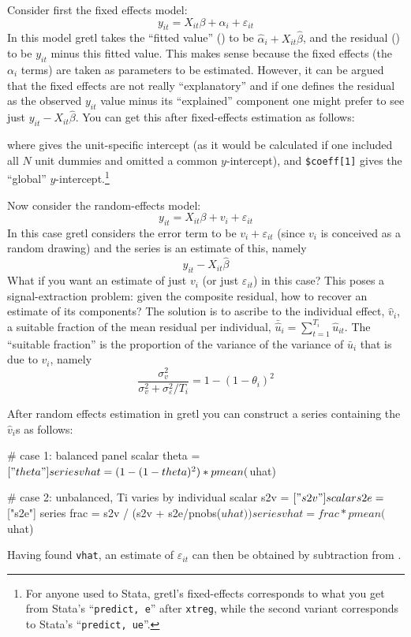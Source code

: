 Consider first the fixed effects model:
\[
y_{it} = X_{it}\beta + \alpha_i + \varepsilon_{it}
\]
In this model gretl takes the ``fitted value'' () to be
$\hat{\alpha}_i + X_{it}\hat{\beta}$, and the residual ()
to be $y_{it}$ minus this fitted value. This makes sense because the
fixed effects (the $\alpha_i$ terms) are taken as parameters to be
estimated. However, it can be argued that the fixed effects are not
really ``explanatory'' and if one defines the residual as the observed
$y_{it}$ value minus its ``explained'' component one might prefer to
see just $y_{it} - X_{it}\hat{\beta}$. You can get this after
fixed-effects estimation as follows:
%
%
where  gives the unit-specific intercept (as it would be
calculated if one included all
$N$ unit dummies and omitted a common
$y$-intercept), and \verb|$coeff[1]| gives the ``global''
$y$-intercept.\footnote{For anyone used to Stata, gretl's
  fixed-effects  corresponds to what you get from Stata's
  ``\texttt{predict, e}'' after \texttt{xtreg}, while the second
  variant corresponds to Stata's ``\texttt{predict, ue}''.}

Now consider the random-effects model:
\[
y_{it} = X_{it}\beta + v_i + \varepsilon_{it}
\]
In this case gretl considers the error term to be
$v_i + \varepsilon_{it}$ (since $v_i$ is conceived as a random
drawing) and the  series is an estimate of this, namely
\[
y_{it} - X_{it}\hat{\beta}
\]
What if you want an estimate of just $v_i$ (or just
$\varepsilon_{it}$) in this case? This poses a signal-extraction
problem: given the composite residual, how to recover an estimate of
its components? The solution is to ascribe to the individual effect,
$\hat{v}_i$, a suitable fraction of the mean residual per individual,
$\bar{\hat{u}}_i = \sum_{t=1}^{T_i} \hat{u}_{it}$. The ``suitable
fraction'' is the proportion of the variance of the variance of
$\bar{u}_i$ that is due to $v_i$, namely
\[
\frac{\sigma^2_v}{\sigma^2_v + \sigma^2_{\varepsilon}/T_i} =
 1 - (1-\theta_i)^2
\]

After random effects estimation in gretl you can construct a series
containing the $\hat{v}_i$s as follows:
%
\begin{code}
# case 1: balanced panel
scalar theta = $["theta"]
series vhat = (1 - (1 - theta)^2) * pmean($uhat)

# case 2: unbalanced, Ti varies by individual
scalar s2v = $["s2v"]
scalar s2e = $["s2e"]
series frac = s2v / (s2v + s2e/pnobs($uhat))
series vhat = frac * pmean($uhat)
\end{code}
%
Having found \texttt{vhat}, an estimate of $\varepsilon_{it}$ can then
be obtained by subtraction from .

